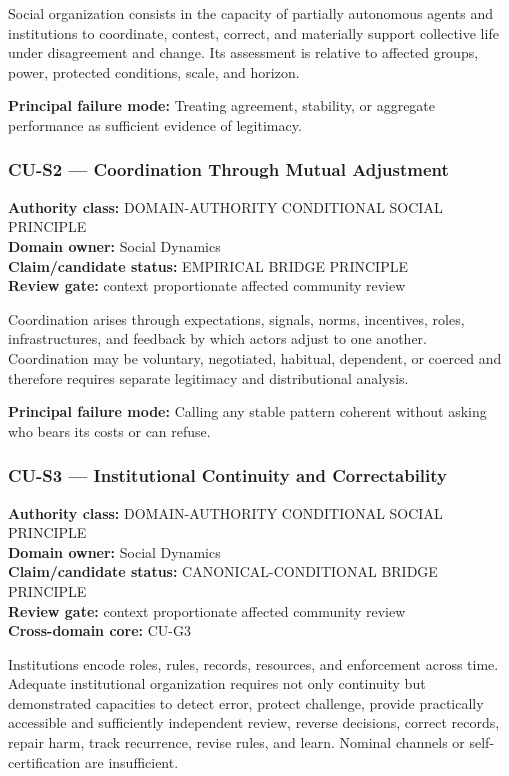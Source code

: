 \documentclass[
  11pt,
]{article}
\begin{document}
Social organization consists in the capacity of partially autonomous
agents and institutions to coordinate, contest, correct, and materially
support collective life under disagreement and change. Its assessment is
relative to affected groups, power, protected conditions, scale, and
horizon.

\textbf{Principal failure mode:} Treating agreement, stability, or
aggregate performance as sufficient evidence of legitimacy.

\subsubsection{CU-S2 --- Coordination Through Mutual
Adjustment}\label{cu-s2-coordination-through-mutual-adjustment}

\textbf{Authority class:} DOMAIN-AUTHORITY CONDITIONAL SOCIAL
PRINCIPLE\\
\textbf{Domain owner:} Social Dynamics\\
\textbf{Claim/candidate status:} EMPIRICAL BRIDGE PRINCIPLE\\
\textbf{Review gate:} context proportionate affected community review

Coordination arises through expectations, signals, norms, incentives,
roles, infrastructures, and feedback by which actors adjust to one
another. Coordination may be voluntary, negotiated, habitual, dependent,
or coerced and therefore requires separate legitimacy and distributional
analysis.

\textbf{Principal failure mode:} Calling any stable pattern coherent
without asking who bears its costs or can refuse.

\subsubsection{CU-S3 --- Institutional Continuity and
Correctability}\label{cu-s3-institutional-continuity-and-correctability}

\textbf{Authority class:} DOMAIN-AUTHORITY CONDITIONAL SOCIAL
PRINCIPLE\\
\textbf{Domain owner:} Social Dynamics\\
\textbf{Claim/candidate status:} CANONICAL-CONDITIONAL BRIDGE
PRINCIPLE\\
\textbf{Review gate:} context proportionate affected community review\\
\textbf{Cross-domain core:} CU-G3

Institutions encode roles, rules, records, resources, and enforcement
across time. Adequate institutional organization requires not only
continuity but demonstrated capacities to detect error, protect
challenge, provide practically accessible and sufficiently independent
review, reverse decisions, correct records, repair harm, track
recurrence, revise rules, and learn. Nominal channels or
self-certification are insufficient.
\end{document}
